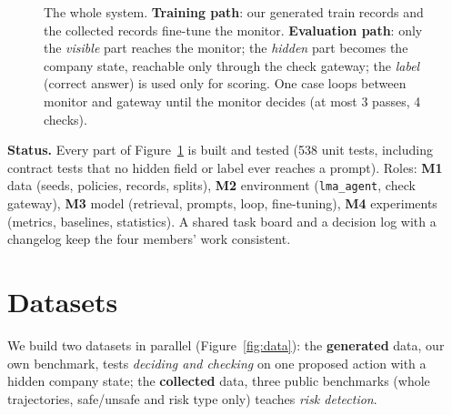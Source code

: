 \documentclass[10pt]{article}
\begin{document}
\begin{figure}[h]
\caption{The whole system. \textbf{Training path}: our generated train records and the collected records fine-tune the monitor.
\textbf{Evaluation path}: only the \emph{visible} part reaches the monitor; the \emph{hidden} part becomes the
company state, reachable only through the check gateway; the \emph{label} (correct answer) is used only for scoring. One case loops between
monitor and gateway until the monitor decides (at most 3 passes, 4 checks).}
\label{fig:pipeline}
\end{figure}

\textbf{Status.} Every part of Figure~\ref{fig:pipeline} is built and tested (538 unit tests, including contract
tests that no hidden field or label ever reaches a prompt). Roles: \textbf{M1} data (seeds, policies, records,
splits), \textbf{M2} environment (\texttt{lma\_agent}, check gateway), \textbf{M3} model (retrieval, prompts, loop,
fine-tuning), \textbf{M4} experiments (metrics, baselines, statistics). A shared task board and a decision log with a
changelog keep the four members' work consistent.

\section{Datasets}
We build two datasets in parallel (Figure~\ref{fig:data}): the \textbf{generated} data, our own benchmark, tests
\emph{deciding and checking} on one proposed action with a hidden company state; the \textbf{collected} data, three public
benchmarks (whole trajectories,
safe/unsafe and risk type only) teaches \emph{risk detection}.
\end{document}
